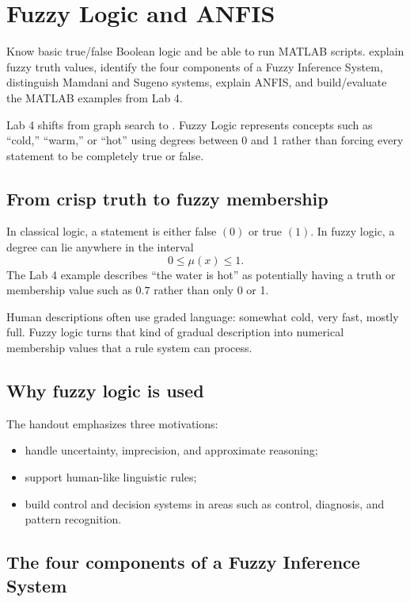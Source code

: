 \chapter{Fuzzy Logic and ANFIS}
\label{ch:fuzzy}

\chapterguide%
  {Know basic true/false Boolean logic and be able to run MATLAB scripts.}
  {explain fuzzy truth values, identify the four components of a Fuzzy Inference System, distinguish Mamdani and Sugeno systems, explain ANFIS, and build/evaluate the MATLAB examples from Lab 4.}

Lab 4 shifts from graph search to . Fuzzy Logic represents concepts such as ``cold,'' ``warm,'' or ``hot'' using degrees between 0 and 1 rather than forcing every statement to be completely true or false.

\section{From crisp truth to fuzzy membership}

In classical logic, a statement is either false \((0)\) or true \((1)\). In fuzzy logic, a degree can lie anywhere in the interval
\[
0\leq \mu(x)\leq 1.
\]
The Lab 4 example describes ``the water is hot'' as potentially having a truth or membership value such as \(0.7\) rather than only 0 or 1.

\begin{intuition}
Human descriptions often use graded language: somewhat cold, very fast, mostly full. Fuzzy logic turns that kind of gradual description into numerical membership values that a rule system can process.
\end{intuition}

\section{Why fuzzy logic is used}

The handout emphasizes three motivations:
\begin{itemize}
  \item handle uncertainty, imprecision, and approximate reasoning;
  \item support human-like linguistic rules;
  \item build control and decision systems in areas such as control, diagnosis, and pattern recognition.
\end{itemize}

\section{The four components of a Fuzzy Inference System}

